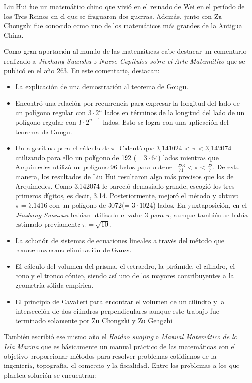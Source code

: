 \documentclass[a4paper, 11pt]{article}
\begin{document}
		Liu Hui fue un matemático chino que vivió en el reinado de Wei en el período de los Tres Reinos en el que se
		fraguaron dos guerras. Además, junto con Zu Chongzhi fue conocido como uno de los matemáticos más grandes de la
		Antigua China.

		Como gran aportación al mundo de las matemáticas cabe destacar un comentario realizado a \textit{Jiuzhang Suanshu}
		o \textit{Nueve Capítulos sobre el Arte Matemático} que se publicó en el año 263. En este comentario, destacan:
		
		\begin{itemize}
			\item La explicación de una demostración al teorema de Gougu.
			\item Encontró una relación por recurrencia para expresar la longitud del lado de un polígono regular con
			$3 \cdot 2^n$ lados en términos de la longitud del lado de un polígono regular con $3 \cdot 2^{n-1}$ lados.
			Esto se logra con una aplicación del teorema de Gougu.
			\item Un algoritmo para el cálculo de $\pi$. Calculó que 3,141024 < $\pi$ < 3,142074 utilizando para ello un
			polígono de 192 (= $3 \cdot 64$) lados mientras que Arquímedes utilizó un polígono 96 lados para obtener
			$\frac {223}{71} < \pi < \frac{22}{7}$. De esta manera, los resultados de Liu Hui resultaron algo más precisos
			que los de Arquímedes. Como 3.142074 le pareció demasiado grande, escogió los tres primeros dígitos, es decir,
			3.14. Posteriormente, mejoró el método y obtuvo $\pi = 3.1416$ con un polígono de 3072(= $3 \cdot 1024$) lados.
			En yuxtaposición, en el \textit{Jiuzhang Suanshu} habían utilizado el valor 3 para $\pi$, aunque también se
			había estimado previamente $\pi = \sqrt{10}$.
			\item La solución de sistemas de ecuaciones lineales a través del método que conocemos como eliminación de Gauss.
			\item El cálculo del volumen del prisma, el tetraedro, la pirámide, el cilindro, el cono y el tronco cónico,
			siendo así uno de los mayores contribuyentes a la geometría sólida empírica.
			\item El principio de Cavalieri para encontrar el volumen de un cilindro y la intersección de dos cilindros
			perpendiculares aunque este trabajo fue terminado solamente por  Zu Chongzhi y Zu Gengzhi.
		\end{itemize}

		También escribió ese mismo año el \textit{Haidao suajing} o \textit{Manual Matemático de la Isla Marina} que es
		básicamente un manual práctico de las matemáticas con el objetivo proporcionar métodos para resolver problemas
		cotidianos de la ingeniería, topografía, el comercio y la fiscalidad. Entre los problemas a los que plantea
		solución se encuentran:
		
\end{document}
